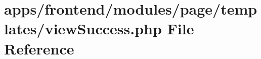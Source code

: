 \hypertarget{frontend_2modules_2page_2templates_2view_success_8php}{\section{apps/frontend/modules/page/templates/view\-Success.php File Reference}
\label{frontend_2modules_2page_2templates_2view_success_8php}
}
